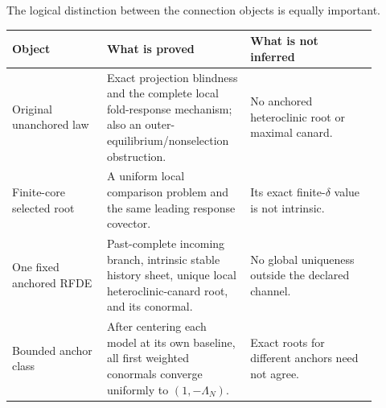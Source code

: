 The logical distinction between the connection objects is equally important.

\begin{center}
\small
\begin{tabular}{@{}>{\raggedright\arraybackslash}p{0.24\linewidth}%
>{\raggedright\arraybackslash}p{0.34\linewidth}%
>{\raggedright\arraybackslash}p{0.32\linewidth}@{}}
\toprule
Object & What is proved & What is not inferred\\
\midrule
Original unanchored law &
Exact projection blindness and the complete local fold-response mechanism;
also an outer-equilibrium/nonselection obstruction. &
No anchored heteroclinic root or maximal canard.\\
Finite-core selected root &
A uniform local comparison problem and the same leading response covector. &
Its exact finite-\(\delta\) value is not intrinsic.\\
One fixed anchored RFDE &
Past-complete incoming branch, intrinsic stable history sheet, unique local
heteroclinic-canard root, and its conormal. &
No global uniqueness outside the declared channel.\\
Bounded anchor class &
After centering each model at its own baseline, all first weighted conormals
converge uniformly to \((1,-\Lambda_N)\). &
Exact roots for different anchors need not agree.\\
\bottomrule
\end{tabular}
\end{center}
